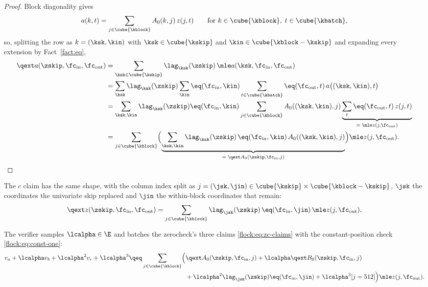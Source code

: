 \begin{proof}
Block diagonality gives
\[
a(k,t)=\sum_{j\in\cube{\kblock}}A_0(k,j)\,z(j,t)\qquad\text{for }k\in\cube{\kblock},\;t\in\cube{\kbatch},
\]
so, splitting the row as $k=(\ksk,\kin)$ with $\ksk\in\cube{\kskip}$ and $\kin\in\cube{\kblock-\kskip}$ and expanding every extension by Fact~\ref{fact:eq},
\begin{align*}
\qext a(\zskip,\fc_{\mathrm{in}},\fc_{\mathrm{out}})&=\sum_{\ksk\in\cube{\kskip}}\lag_{\ksk}(\zskip)\,\mle a(\ksk,\fc_{\mathrm{in}},\fc_{\mathrm{out}})\\
&=\sum_{\ksk}\lag_{\ksk}(\zskip)\sum_{\kin}\eq(\fc_{\mathrm{in}},\kin)\sum_{t\in\cube{\kbatch}}\eq(\fc_{\mathrm{out}},t)\,a\bigl((\ksk,\kin),t\bigr)\\
&=\sum_{\ksk,\kin}\lag_{\ksk}(\zskip)\eq(\fc_{\mathrm{in}},\kin)\sum_{j\in\cube{\kblock}}A_0((\ksk,\kin),j)\underbrace{\sum_{t}\eq(\fc_{\mathrm{out}},t)\,z(j,t)}_{=\;\mle z(j,\fc_{\mathrm{out}})}\\
&=\sum_{j\in\cube{\kblock}}\Bigl(\underbrace{\sum_{\ksk,\kin}\lag_{\ksk}(\zskip)\,\eq(\fc_{\mathrm{in}},\kin)\,A_0((\ksk,\kin),j)}_{=\;\qext A_0(\zskip,\fc_{\mathrm{in}},j)}\Bigr)\mle z(j,\fc_{\mathrm{out}}).
\end{align*}
\end{proof}

The $c$ claim has the same shape, with the column index split as $j=(\jsk,\jin) \in\cube{\kskip} \times \cube{\kblock-\kskip}$, $\jsk$ the coordinates the univariate skip replaced and $\jin$ the within-block coordinates that remain:
\begin{equation}\label{flock:eq:c-as-column}
\qext z(\zskip,\fc_{\mathrm{in}},\fc_{\mathrm{out}})=\sum_{j\in\cube{\kblock}}\lag_{\jsk}(\zskip)\,\eq(\fc_{\mathrm{in}},\jin)\,\mle z(j,\fc_{\mathrm{out}}),
\end{equation}

\vspace{3mm}

The verifier samples $\lcalpha\in\E$ and batches the zerocheck's three claims \eqref{flock:eq:zc-claims} with the constant-position check \eqref{flock:eq:const-one}:
\begin{equation}\label{flock:eq:lincheck}
\begin{split}
v_a+\lcalpha v_b+\lcalpha^2v_c+\lcalpha^3\qeq\sum_{j\in\cube{\kblock}}\Bigl(&\qext A_0(\zskip,\fc_{\mathrm{in}},j)+\lcalpha\qext B_0(\zskip,\fc_{\mathrm{in}},j)\\
&+\lcalpha^2\lag_{\jsk}(\zskip)\eq(\fc_{\mathrm{in}},\jin)+\lcalpha^3[j=512]\Bigr)\mle z(j,\fc_{\mathrm{out}}).
\end{split}
\end{equation}

